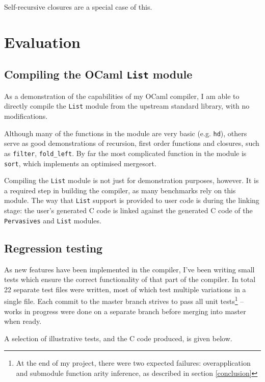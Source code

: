 \documentclass[12pt,a4paper,twoside,openright]{report}
\begin{document}
Self-recursive closures are a special case of this.



\chapter{Evaluation}

\section{Compiling the OCaml \texttt{List} module}\label{module-list}

As a demonstration of the capabilities of my OCaml compiler, I am able to
directly compile the \lstinline!List! module from the upstream standard
library, with no modifications.

Although many of the functions in the module are very basic (e.g.
\lstinline!hd!), others serve as good demonstrations of recursion, first order
functions and closures, such as \lstinline!filter!, \lstinline!fold_left!. By
far the most complicated function in the module is \lstinline!sort!, which
implements an optimised mergesort.

Compiling the \lstinline!List! module is not just for demonstration purposes,
however. It is a required step in building the compiler, as many benchmarks
rely on this module. The way that \lstinline!List! support is provided to user
code is during the linking stage: the user's generated C code is linked
against the generated C code of the \lstinline!Pervasives! and \lstinline!List!
modules.

\section{Regression testing}\label{regression-testing}

As new features have been implemented in the compiler, I've been writing small
tests which ensure the correct functionality of that part of the compiler. In
total 22 separate test files were written, most of which test multiple
variations in a single file. Each commit to the master branch strives to pass
all unit tests\footnote{At the end of my project, there were two expected
  failures: overapplication and submodule function arity inference, as
  described in section \ref{conclusion}}
-- works in progress were done on a separate branch before merging into master
when ready.

A selection of illustrative tests, and the C code produced, is given below.
\end{document}
